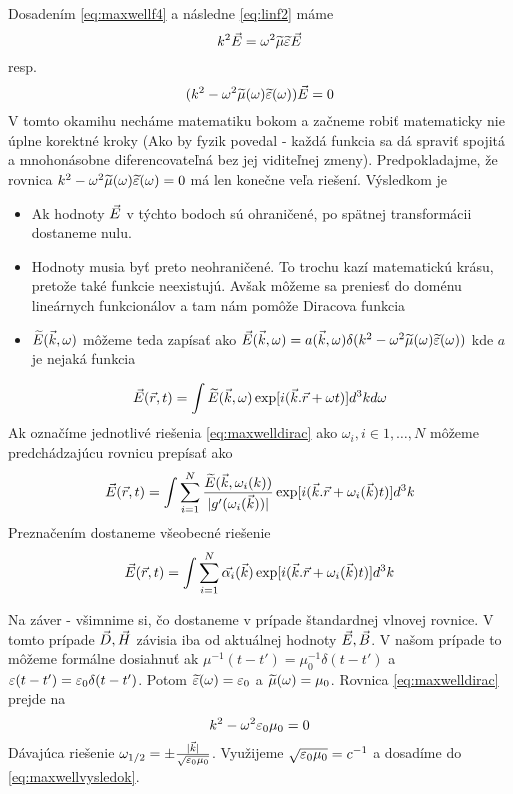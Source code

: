 Dosadením \ref{eq:maxwellf4} a následne \ref{eq:linf2} máme
\begin{equation}
  k^2 \vec{E} = \omega^2 \widetilde{\mu}\widetilde{\varepsilon} \vec{E}    
\end{equation}
resp.
\begin{equation}
    \label{eq:maxwelldirac}
  (k^2 - \omega^2 \widetilde{\mu}(\omega)\widetilde{\varepsilon}(\omega)) \vec{E} =0
\end{equation}
V tomto okamihu necháme matematiku bokom a začneme robiť matematicky
nie úplne korektné kroky (Ako by fyzik povedal - každá funkcia sa dá
spraviť spojitá a mnohonásobne diferencovateľná bez jej viditeľnej
zmeny). Predpokladajme, že rovnica 
  $k^2 - \omega^2 \widetilde{\mu}(\omega)\widetilde{\varepsilon}(\omega)=0$ má len
  konečne veľa riešení. Výsledkom je 
\begin{itemize}
\item Ak hodnoty $\vec{E}$ v týchto bodoch sú ohraničené, po spätnej
    transformácii dostaneme nulu.
\item Hodnoty musia byť preto neohraničené. To trochu kazí matematickú
krásu, pretože také funkcie neexistujú. Avšak môžeme sa preniesť do
doménu lineárnych funkcionálov a tam nám pomôže Diracova funkcia
\item $\widetilde{E}{(\vec{k},\omega)}$ môžeme teda zapísať ako $\vec{E}{(\vec{k},\omega)} = a{(\vec{k},\omega)}
\delta( k^2 - \omega^2 \widetilde{\mu}(\omega)\widetilde{\varepsilon}(\omega))$ kde $a$
je nejaká funkcia
\end{itemize}

\begin{equation}
    \vec{E}{(\vec{r},t)} = \int \widetilde{E}{(\vec{k},\omega)} \exp[i (\vec{k}.\vec{r} +
    \omega t)] d^3k d\omega
\end{equation}
Ak označíme jednotlivé riešenia \ref{eq:maxwelldirac} ako $\omega_i, i
\in 1,\dots,N$ môžeme predchádzajúcu rovnicu prepísať ako
\begin{equation}
    \vec{E}{(\vec{r},t)} = \int \sum_{i=1}^N
    \frac{\widetilde{E}(\vec{k},\omega_i(k))}{|g'(\omega_i(\vec{k}))|}
    \exp[i (\vec{k} . \vec{r} + \omega_i(\vec{k}) t)] d^3k
\end{equation}
Preznačením dostaneme všeobecné riešenie
\begin{equation}
    \label{eq:maxwellvysledok}
    \vec{E}{(\vec{r},t)} = \int \sum_{i=1}^N \vec{\alpha_i}(\vec{k})
    \exp[i(\vec{k}.\vec{r} + \omega_i(\vec{k}) t)] d^3 k
\end{equation}

Na záver - všimnime si, čo dostaneme v prípade štandardnej vlnovej
rovnice. V tomto prípade $\vec{D},\vec{H}$ závisia iba od
aktuálnej hodnoty $\vec{E},\vec{B}$. V našom prípade to môžeme
formálne dosiahnuť ak $\mu^{-1}(t-t')=\mu_0^{-1} \delta(t-t')$ a
$\varepsilon(t-t')=\varepsilon_0 \delta(t-t')$.
Potom $\widetilde{\varepsilon}(\omega) = \varepsilon_0$ a $\widetilde{\mu}(\omega)=\mu_0$.
Rovnica \ref{eq:maxwelldirac} prejde na
\begin{equation}
    k^2 - \omega^2 \varepsilon_0 \mu_0 = 0
\end{equation}
Dávajúca riešenie $\omega_{1/2}=\pm \frac{|\vec{k}|}{\sqrt{\varepsilon_0
\mu_0}}$. Využijeme $\sqrt{\varepsilon_0 \mu_0}=c^{-1}$ a dosadíme do
\ref{eq:maxwellvysledok}.

